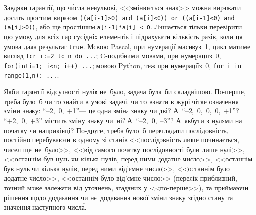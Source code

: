 \Tutorial	Завдяки гарантії, що ч\'{и}сла ненульові, <<змінюється знак>> можна виражати досить простим виразом \texttt{(\mbox{(a[i-1]>0)} and \mbox{(a[i]<0)}) or (\mbox{(a[i-1]<0)} and \mbox{(a[i]>0)})}, або ще простішим \verb"a[i-1]*a[i] < 0". Лишається тільки перевірити цю умову для всіх пар сусідніх елементів і підрахувати кількість разів, коли ця умова дала результат \texttt{true}. Мовою Pascal, при нумерації масиву\nolinebreak[2] з~1, цикл матиме вигляд \texttt{for i:=2~to~n do~...}; C-подібними мовами, при нумерації\nolinebreak[2] з~0, \texttt{for(int\nolinebreak[3] i=1; i<n; i++)~...}; мовою Python, %
теж при нумерації\nolinebreak[2] з~0, \texttt{for i in \mbox{range(1,n)}:~...}.

Якби гарантії відсутності нулів не~було, задача була~би складнішою. По-перше, треба було~б чи то знайти в умові задачі, чи то взнати в журі чітке означення зміни знаку: \mbox{``--2, 0, +1''}\nolinebreak[3] --- це одна зміна знаку чи дві? А~\mbox{``--2, 0, 0, 0, +1''}? \mbox{``+2, 0, +3''} містить зміну знаку чи~ні? А~\mbox{``--2, 0, --3''}? А~як\nolinebreak[2] бути з нулями на початку чи наприкінці? По-друге, треба було~б переглядати послідовність, постійно перебуваючи в одному зі станів <<послідовність лише починається, чисел ще~не~було>>, <<від самого початку послідовності були лише нулі>>, <<останнім був нуль чи кілька нулів, перед ними додатне число>>, <<останнім був нуль чи кілька нулів, перед ними від'ємне число>>, <<останнім було додатне число>>, <<останнім було від'ємне число>> (перелік приблизний, точний може залежати від уточнень, згаданих у <<по-перше>>), та приймаючи рішення щодо додавання чи не~додавання нової зміни знаку згідно стану та значення наступного числ\'{а}.
